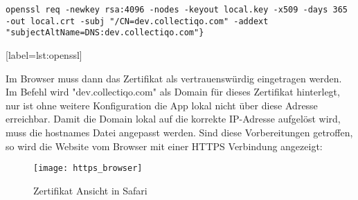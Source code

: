 \vspace{1em}
\lstset{language=sh}
\begin{lstlisting}[label={lst:openssl}]
openssl req -newkey rsa:4096 -nodes -keyout local.key -x509 -days 365 -out local.crt -subj "/CN=dev.collectiqo.com" -addext "subjectAltName=DNS:dev.collectiqo.com"}
\end{lstlisting}[label={lst:openssl}]
\vspace{1em}

Im Browser muss dann das Zertifikat als vertrauenswürdig eingetragen werden.
Im Befehl wird "dev.collectiqo.com" als Domain für dieses Zertifikat hinterlegt, nur ist ohne weitere Konfiguration die App lokal nicht über diese Adresse erreichbar.
Damit die Domain lokal auf die korrekte IP-Adresse aufgelöst wird, muss die hostnames Datei angepasst werden.
Sind diese Vorbereitungen getroffen, so wird die Website vom Browser mit einer HTTPS Verbindung angezeigt:

\begin{figure}[h]
    \centering
    \texttt{[image: https\_browser]}
    \caption{Zertifikat Ansicht in Safari}
    \label{fig:https_browser}
\end{figure}